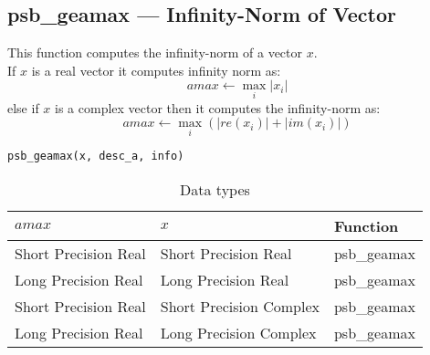\clearpage\subsection*{psb\_geamax --- Infinity-Norm of Vector}    

This function computes 
 the infinity-norm of a vector $x$.\\
If $x$ is a real  vector
it computes infinity norm as:
\[ amax \leftarrow \max_i |x_i|\]
else if $x$ is a complex vector then it computes the infinity-norm  as:
\[ amax \leftarrow \max_i {(|re(x_i)| + |im(x_i)|)}\]

\begin{verbatim}
psb_geamax(x, desc_a, info)
\end{verbatim}

\begin{table}[h]
\begin{center}
\begin{tabular}{lll}
\hline
$amax$ & $x$ & {\bf Function}\\
\hline
Short Precision Real& Short Precision Real & psb\_geamax \\
Long Precision Real&Long Precision Real & psb\_geamax \\
Short Precision Real&Short Precision Complex & psb\_geamax \\
Long Precision Real&Long Precision Complex & psb\_geamax \\
\hline
\end{tabular}
\end{center}
\caption{Data types\label{tab:f90amax}}
\end{table}


